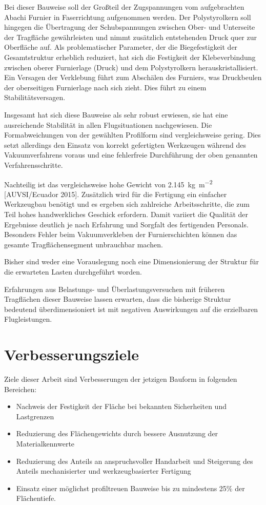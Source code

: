 Bei dieser Bauweise soll der Großteil der Zugspannungen vom aufgebrachten Abachi Furnier in Faserrichtung aufgenommen werden. Der Polystyrolkern soll hingegen die Übertragung der Schubspannungen zwischen Ober- und Unterseite der Tragfläche gewährleisten und nimmt zusätzlich entstehenden Druck quer zur Oberfläche auf. Als problematischer Parameter, der die Biegefestigkeit der Gesamtstruktur erheblich reduziert, hat sich die Festigkeit der Klebeverbindung zwischen oberer Furnierlage (Druck) und dem Polystyrolkern herauskristallisiert. Ein Versagen der Verklebung führt zum Abschälen des Furniers, was Druckbeulen der oberseitigen Furnierlage nach sich zieht. Dies führt zu einem Stabilitätsversagen.

Insgesamt hat sich diese Bauweise als sehr robust erwiesen, sie  hat eine ausreichende Stabilität in allen Flugsituationen nachgewiesen.
Die Formabweichungen von der gewählten Profilform sind vergleichsweise gering. Dies setzt allerdings den Einsatz von korrekt gefertigten Werkzeugen während des Vakuumverfahrens voraus und eine fehlerfreie Durchführung der oben genannten Verfahrensschritte.  

Nachteilig ist das vergleichsweise hohe Gewicht von \SI[per-mode=symbol]{2,145}{\kilogram\per\meter\squared} [AUVSI/Ecuador 2015].
Zusätzlich wird für die Fertigung ein einfacher Werkzeugbau benötigt und es ergeben sich zahlreiche Arbeitsschritte, die zum Teil hohes handwerkliches Geschick erfordern. Damit variiert die Qualität der Ergebnisse deutlich je nach Erfahrung und Sorgfalt des fertigenden Personals. Besonders Fehler beim Vakuumverkleben der Furnierschichten können das gesamte Tragflächensegment unbrauchbar machen. 

Bisher sind weder eine Vorauslegung noch eine Dimensionierung der Struktur für die erwarteten Lasten durchgeführt worden.

Erfahrungen aus Belastungs- und Überlastungsversuchen mit früheren Tragflächen dieser Bauweise lassen erwarten, dass die bisherige Struktur bedeutend überdimensioniert ist mit negativen Auswirkungen auf die erzielbaren Flugleistungen. 

\clearpage

\section{Verbesserungsziele}

Ziele dieser Arbeit sind Verbesserungen der jetzigen Bauform in folgenden Bereichen:
\begin{itemize}
    \item Nachweis der Festigkeit der Fläche bei bekannten Sicherheiten und Lastgrenzen
    \item Reduzierung des Flächengewichts durch bessere Ausnutzung der Materialkennwerte
    \item Reduzierung des Anteils an anspruchsvoller Handarbeit und Steigerung des Anteils mechanisierter und werkzeugbasierter Fertigung
    \item Einsatz einer möglichst profiltreuen Bauweise bis zu mindestens 25\% der Flächentiefe.
    \label{lst:Verbesserungsziele}
\end{itemize}


